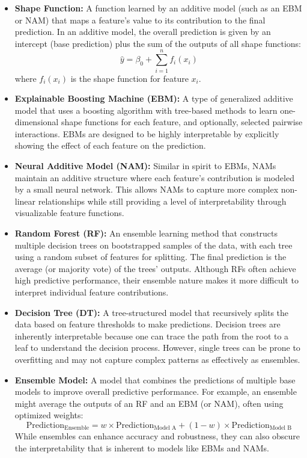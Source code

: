 \documentclass{article}
\begin{document}
\begin{itemize}
    \item \textbf{Shape Function:}  
    A function learned by an additive model (such as an EBM or NAM) that maps a feature’s value to its contribution to the final prediction. In an additive model, the overall prediction is given by an intercept (base prediction) plus the sum of the outputs of all shape functions:
    \[
    \hat{y} = \beta_0 + \sum_{i=1}^{n} f_i(x_i)
    \]
    where \( f_i(x_i) \) is the shape function for feature \( x_i \).

    \item \textbf{Explainable Boosting Machine (EBM):}  
    A type of generalized additive model that uses a boosting algorithm with tree-based methods to learn one-dimensional shape functions for each feature, and optionally, selected pairwise interactions. EBMs are designed to be highly interpretable by explicitly showing the effect of each feature on the prediction.

    \item \textbf{Neural Additive Model (NAM):}  
    Similar in spirit to EBMs, NAMs maintain an additive structure where each feature’s contribution is modeled by a small neural network. This allows NAMs to capture more complex non-linear relationships while still providing a level of interpretability through visualizable feature functions.

    \item \textbf{Random Forest (RF):}  
    An ensemble learning method that constructs multiple decision trees on bootstrapped samples of the data, with each tree using a random subset of features for splitting. The final prediction is the average (or majority vote) of the trees' outputs. Although RFs often achieve high predictive performance, their ensemble nature makes it more difficult to interpret individual feature contributions.

    \item \textbf{Decision Tree (DT):}  
    A tree-structured model that recursively splits the data based on feature thresholds to make predictions. Decision trees are inherently interpretable because one can trace the path from the root to a leaf to understand the decision process. However, single trees can be prone to overfitting and may not capture complex patterns as effectively as ensembles.

    \item \textbf{Ensemble Model:}  
    A model that combines the predictions of multiple base models to improve overall predictive performance. For example, an ensemble might average the outputs of an RF and an EBM (or NAM), often using optimized weights:
    \[
    \text{Prediction}_{\text{Ensemble}} = w \times \text{Prediction}_{\text{Model A}} + (1 - w) \times \text{Prediction}_{\text{Model B}}
    \]
    While ensembles can enhance accuracy and robustness, they can also obscure the interpretability that is inherent to models like EBMs and NAMs.
\end{itemize}
\end{document}
